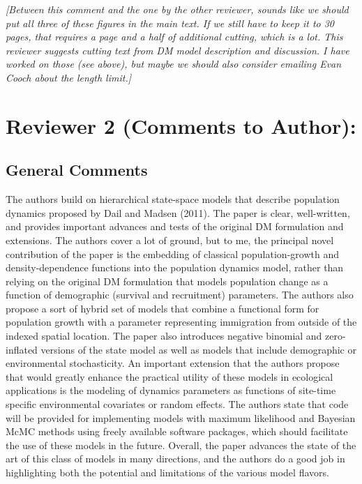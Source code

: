 \documentclass[12pt,english]{article}
\begin{document}
\begin{spacing}{1.9}
\begin{flushleft}
\vspace{0.5cm}
\textit{[Between this comment and the one by the other reviewer, sounds like we should 
put all three of these figures in the main text.  If we still have to keep it to 30 pages,
that requires a page and a half of additional cutting, which is a lot.  This reviewer suggests cutting
text from DM model description and discussion.  I have worked on those (see above), but maybe we
should also consider emailing Evan Cooch about the length limit.]}
\vspace{0.5cm}


\section*{Reviewer 2 (Comments to Author):} 
\label{sec:rev2}
\subsection*{General Comments}
The authors build on hierarchical state-space models that describe population
dynamics proposed by Dail and Madsen (2011). The paper is clear, well-written,
and provides important advances and tests of the original DM formulation and
extensions. The authors cover a lot of ground, but to me, the principal novel
contribution of the paper is the embedding of classical population-growth and
density-dependence functions into the population dynamics model, rather than
relying on the original DM formulation that models population change as a
function of demographic (survival and recruitment) parameters. The authors also
propose a sort of hybrid set of models that combine a functional form for
population growth with a parameter representing immigration from outside of the
indexed spatial location. The paper also introduces negative binomial and
zero-inflated versions of the state model as well as models that include
demographic or environmental stochasticity. An important extension that
the authors propose that would greatly enhance the practical utility of these
models in ecological applications is the modeling of dynamics parameters as
functions of site-time specific environmental covariates or random effects. The
authors state that code will be provided for implementing models with maximum
likelihood and Bayesian McMC methods using freely available software packages,
which should facilitate the use of these models in the future. Overall, the
paper advances the state of the art of this class of models in many directions,
and the authors do a good job in highlighting both the potential and limitations
of the various model flavors.


\end{flushleft}
\end{spacing}
\end{document}
